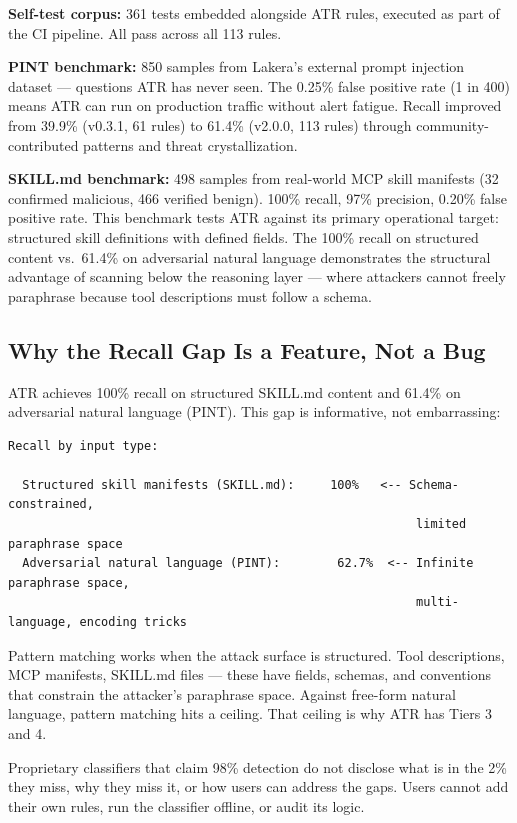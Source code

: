 \documentclass[11pt,letterpaper]{article}
\begin{document}
\textbf{Self-test corpus:} 361 tests embedded alongside ATR rules, executed as part of the CI pipeline. All pass across all 113 rules.

\textbf{PINT benchmark:} 850 samples from Lakera's external prompt injection dataset \cite{pint} --- questions ATR has never seen. The 0.25\% false positive rate (1 in 400) means ATR can run on production traffic without alert fatigue. Recall improved from 39.9\% (v0.3.1, 61 rules) to 61.4\% (v2.0.0, 113 rules) through community-contributed patterns and threat crystallization.

\textbf{SKILL.md benchmark:} 498 samples from real-world MCP skill manifests (32 confirmed malicious, 466 verified benign). 100\% recall, 97\% precision, 0.20\% false positive rate. This benchmark tests ATR against its primary operational target: structured skill definitions with defined fields. The 100\% recall on structured content vs.\ 61.4\% on adversarial natural language demonstrates the structural advantage of scanning below the reasoning layer --- where attackers cannot freely paraphrase because tool descriptions must follow a schema.


\subsection{Why the Recall Gap Is a Feature, Not a Bug}

ATR achieves 100\% recall on structured SKILL.md content and 61.4\% on adversarial natural language (PINT). This gap is informative, not embarrassing:

\begin{lstlisting}
Recall by input type:

  Structured skill manifests (SKILL.md):     100%   <-- Schema-constrained,
                                                         limited paraphrase space
  Adversarial natural language (PINT):        62.7%  <-- Infinite paraphrase space,
                                                         multi-language, encoding tricks
\end{lstlisting}

Pattern matching works when the attack surface is structured. Tool descriptions, MCP manifests, SKILL.md files --- these have fields, schemas, and conventions that constrain the attacker's paraphrase space. Against free-form natural language, pattern matching hits a ceiling. That ceiling is why ATR has Tiers 3 and 4.

Proprietary classifiers that claim 98\% detection do not disclose what is in the 2\% they miss, why they miss it, or how users can address the gaps. Users cannot add their own rules, run the classifier offline, or audit its logic.
\end{document}
